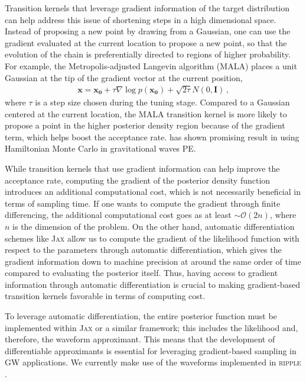 \documentclass[twocolumn]{aastex631}
\begin{document}
Transition kernels that leverage gradient information of the target
distribution can help address this issue of shortening steps in a high
dimensional space. Instead of proposing a new point by drawing from a Gaussian,
one can use the gradient evaluated at the current location to propose a new
point, so that the evolution of the chain is preferentially directed to regions
of higher probability. For example, the Metropolis-adjusted Langevin algorithm
(MALA) \cite{10.2307/2346184} places a unit Gaussian at the tip of the gradient
vector at the current position,
\begin{align}
    \mathbf{x} = \mathbf{x_0} + \tau \nabla\log{p(\mathbf{x_0})} + \sqrt{2\tau}N(0,\mathbf{I})\, ,
\end{align}
where $\tau$ is a step size chosen during the tuning stage. Compared to a
Gaussian centered at the current location, the MALA transition kernel is more
likely to propose a point in the higher posterior density region because of the
gradient term, which helps boost the acceptance rate. \cite{Bouffanais:2018hoz}
has shown promising result in using Hamiltonian Monte Carlo in gravitational
waves PE.

While transition kernels that use gradient information can help improve the
acceptance rate, computing the gradient of the posterior density function
introduces an additional computational cost, which is not necessarily
beneficial in terms of sampling time. If one wants to compute the gradient
through finite differencing, the additional computational cost goes as at least
${\sim} \mathcal{O}(2n)$, where $n$ is the dimension of the problem. On the
other hand, automatic differentiation schemes like \textsc{Jax}
\cite{jax2018github} allow us to compute the gradient of the likelihood
function with respect to the parameters through automatic differentiation,
which gives the gradient information down to machine precision at around the
same order of time compared to evaluating the posterior itself. Thus, having
access to gradient information through automatic differentiation is crucial to
making gradient-based transition kernels favorable in terms of computing cost.

To leverage automatic differentiation, the entire posterior function must be
implemented within \textsc{Jax} or a similar framework; this includes the
likelihood and, therefore, the waveform approximant.  This means that the
development of differentiable approximants is essential for leveraging
gradient-based sampling in GW applications. We currently make use of the
waveforms implemented in \textsc{ripple} \cite{ripplepaper}.
\end{document}

